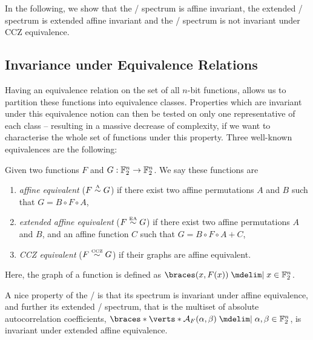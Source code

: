 In the following, we show that the \ACT/ spectrum is affine invariant, the extended \ACT/ spectrum is extended affine invariant and the \ACT/ spectrum is not invariant under CCZ equivalence.

\subsection{Invariance under Equivalence Relations}%
\label{act:sec:invariance}

Having an equivalence relation on the set of all $n$-bit functions, allows us to partition these functions into equivalence classes.
Properties which are invariant under this equivalence notion can then be tested on only one representative of each class -- resulting in a massive decrease of complexity, if we want to characterise the whole set of functions under this property.
Three well-known equivalences are the following:
\begin{definition}
    Given two functions $F$ and $G : \mathbb{F}_2^n \to \mathbb{F}_2^n$.
    We say these functions are
    \begin{enumerate}
        \item \emph{affine equivalent} ($F \stackrel{\text{\tiny A}}{\sim} G$) if there exist two affine permutations $A$ and $B$ such that $G = B \circ F \circ A$,
        \item \emph{extended affine equivalent} ($F \stackrel{\text{\tiny EA}}{\sim} G$) if there exist two affine permutations $A$ and $B$, and an affine function $C$ such that $G = B \circ F \circ A + C$,
        \item \emph{CCZ equivalent} ($F \stackrel{\text{\tiny CCZ}}{\sim} G$) if their graphs are affine equivalent.
    \end{enumerate}
    Here, the graph of a function is defined as $\set{(x, F(x)) \given x \in \F_2^n}$.
\end{definition}

A nice property of the \ACT/ is that its spectrum is invariant under affine equivalence, and further its extended \ACT/ spectrum, that is the multiset of absolute autocorrelation coefficients, $\set*{\abs*{\AC{F}(\alpha, \beta)} \given \alpha, \beta \in \F_2^n}$, is invariant under extended affine equivalence.

